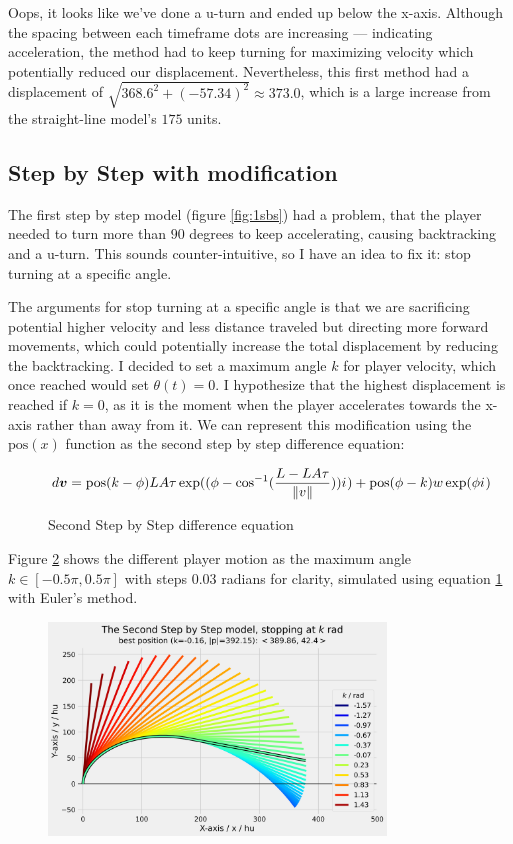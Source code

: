 Oops, it looks like we've done a u-turn and ended up below the x-axis. Although the spacing between each timeframe dots are increasing --- indicating acceleration, the method had to keep turning for maximizing velocity which potentially reduced our displacement. Nevertheless, this first method had a displacement of $\sqrt{368.6^2 + (-57.34)^2} \approx 373.0$, which is a large increase from the straight-line model's $175$ units.

\subsection{Step by Step with modification}
The first step by step model (figure \ref{fig:1sbs}) had a problem, that the player needed to turn more than $90$ degrees to keep accelerating, causing backtracking and a u-turn. This sounds counter-intuitive, so I have an idea to fix it: stop turning at a specific angle.

The arguments for stop turning at a specific angle is that we are sacrificing potential higher velocity and less distance traveled but directing more forward movements, which could potentially increase the total displacement by reducing the backtracking. I decided to set a maximum angle $k$ for player velocity, which once reached would set $\theta(t) = 0$. I hypothesize that the highest displacement is reached if $k=0$, as it is the moment when the player accelerates towards the x-axis rather than away from it. We can represent this modification using the $\text{pos}(x)$ function as the second step by step difference equation:

\begin{figure}[H]
    \centering
    \[
        d\boldsymbol{v} = \text{pos}(k - \phi) LA\tau \exp((\phi - \cos^{-1}(\frac{L-LA\tau}{\|v\|})) {i\mkern1mu}) + \text{pos}(\phi - k) w \exp(\phi {i\mkern1mu})
    \]
    \caption{Second Step by Step difference equation}
    \label{fig:ssbs}
\end{figure}

Figure \ref{fig:sbs2} shows the different player motion as the maximum angle $k\in [-0.5\pi, 0.5\pi]$ with steps $0.03$ radians for clarity, simulated using equation \ref{fig:ssbs} with Euler's method.

\begin{figure}[H]
    \centering
    \includegraphics[width=0.8\textwidth]{assets/step_by_step_2.png}
    \caption{}
    \label{fig:sbs2}
\end{figure}

